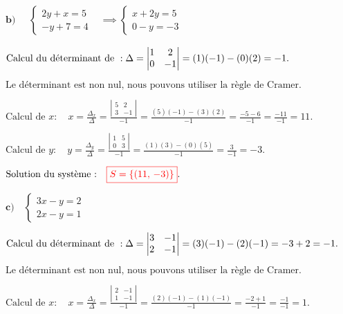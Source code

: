 \documentclass[12pt,a4paper]{article}
\begin{document}
\(\textbf{b)} \quad
\begin{aligned}
\begin{cases}
2y + x = 5 \\
-y + 7 = 4
\end{cases}&\implies
\begin{cases}
x+2y = 5 \\
0-y  = -3
\end{cases}
\end{aligned}
\)


\(
\text{Calcul du déterminant de } : \\
\Delta = \left| \begin{matrix} 1 & 2 \\ 0 & -1 \end{matrix} \right| = (1)(-1) - (0)(2) = -1.
\)

\(
\text{Le déterminant est non nul, nous pouvons utiliser la règle de Cramer.}
\)

\(
\text{Calcul de } x : \quad
x = \frac{\Delta_{x}}{\Delta} = \frac{\left| \begin{matrix} 5 & 2 \\ 3 & -1 \end{matrix} \right|}{-1}
= \frac{(5)(-1) - (3)(2)}{-1} = \frac{-5 - 6}{-1} = \frac{-11}{-1} = 11.
\)

\(
\text{Calcul de } y : \quad
y = \frac{\Delta_{y}}{\Delta} = \frac{\left| \begin{matrix} 1 & 5 \\ 0 & 3 \end{matrix} \right|}{-1}
= \frac{(1)(3) - (0)(5)}{-1} = \frac{3}{-1} = -3.
\)

\(
\text{Solution du système :} \quad
\textcolor{red}{\boxed{S=\left\lbrace  \left( 11, \, -3 \right)  \right\rbrace }}.
\)

\(\textbf{c)} \quad
\begin{cases}
3x - y = 2 \\
2x - y = 1
\end{cases}
\)


\(
\text{Calcul du déterminant de } : \\
\Delta = \left| \begin{matrix} 3 & -1 \\ 2 & -1 \end{matrix} \right| = (3)(-1) - (2)(-1) = -3 + 2 = -1.
\)

\(
\text{Le déterminant est non nul, nous pouvons utiliser la règle de Cramer.}
\)

\(
\text{Calcul de } x : \quad
x = \frac{\Delta_{x}}{\Delta} = \frac{\left| \begin{matrix} 2 & -1 \\ 1 & -1 \end{matrix} \right|}{-1}
= \frac{(2)(-1) - (1)(-1)}{-1} = \frac{-2 + 1}{-1} = \frac{-1}{-1} = 1.
\)
\end{document}
